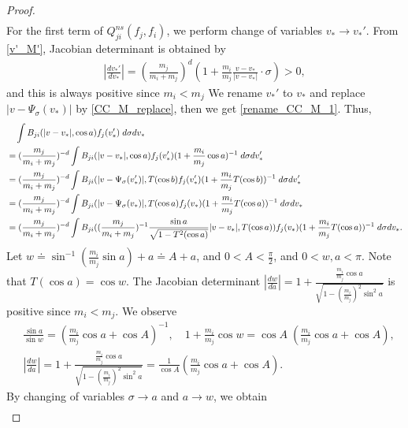 \documentclass[reqno,10pt]{amsart}
\numberwithin{equation}{section}
\begin{document}
\begin{proof}
\begin{align}
\end{align}
For the first term of  $Q^{ns}_{ji}(f_j,f_i)$, we perform change of variables $v_*\rightarrow v_*'$. From \eqref{v'_M'}, Jacobian determinant is obtained by 
\begin{align} \label{Jacobian_CC_M_1}
    |\frac{dv_*'}{dv_*}|=(\frac{m_j}{m_i+m_j})^d(1+\frac{m_i}{m_j}\frac{v-v_*}{|v-v_*|}\cdot \sigma)>0, 
\end{align} and this is always positive since $m_i<m_j$ We rename $v_*'$ to $v_*$ and replace $|v-\Psi_\sigma(v_*)|$ by \eqref{CC_M_replace}, then we get \eqref{rename_CC_M_1}. Thus, 
\begin{align}
     &\quad \int B_{ji}(|v-v_*|,\cos a)f_j(v_*') \;d\sigma dv_*  \label{trans_CC_M_1} \\ 
     &= (\frac{m_j}{m_i+m_j})^{-d}\int  B_{ji}(|v-v_*|,\cos a)f_j(v_*')(1+\frac{m_i}{m_j}\cos a)^{-1} \;d\sigma dv_*'  \notag \\ 
     &= (\frac{m_j}{m_i+m_j})^{-d}\int  B_{ji}(|v-\Psi_\sigma(v_*')|,T(\cos b)f_j(v_*')(1+\frac{m_i}{m_j}T(\cos b))^{-1} \;d\sigma dv_*' \notag \\
     &= (\frac{m_j}{m_i+m_j})^{-d}\int  B_{ji}(|v-\Psi_\sigma(v_*)|,T(\cos a)f_j(v_*)(1+\frac{m_i}{m_j}T(\cos a))^{-1} \;d\sigma dv_* \notag \\
     &= (\frac{m_j}{m_i+m_j})^{-d}\int B_{ji}((\frac{m_j}{m_i+m_j})^{-1}\frac{\sin a}{\sqrt{1-T^2(\cos a)}}|v-v_*|
   ,T(\cos a))f_j(v_*)(1+\frac{m_i}{m_j}T(\cos a))^{-1} \;d\sigma dv_* \label{rename_CC_M_1}.
\end{align}
\noindent  Let $w \doteq \sin^{-1}(\frac{m_i}{m_j}\sin a)+a\doteq A+a$, \;and\; $0 < A < \frac{\pi}{2}$, and $0 < w, a < \pi.$ Note that $T(\cos a) = \cos w$. 
The Jacobian determinant $|\frac{d w}{d a}|=1+\frac{\frac{m_i}{m_j}\cos a}{\sqrt{1-(\frac{m_i}{m_j})^{2}\sin^{2}a}}$ is positive since $m_i<m_j$. We observe
\begin{equation} \label{using}
\begin{split}
    &\frac{\sin a}{\sin w} = (\frac{m_i}{m_j}\cos a + \cos A)^{-1}, \quad
    1+\frac{m_i}{m_j}\cos w =\cos A\;(\frac{m_i}{m_j}\cos a + \cos A),\\
    &|\frac{dw}{da}|=
    1+\frac{\frac{m_i}{m_j}\cos a}{\sqrt{1-(\frac{m_i}{m_j})^{2}\sin^{2}a}} =\frac{1}{\cos A}  (\frac{m_i}{m_j}\cos a + \cos A).
\end{split}
\end{equation}
By changing of variables $\sigma \rightarrow a$ and $a \rightarrow w$, 
we obtain
\begin{align}

\end{align}
\end{proof}
\end{document}
